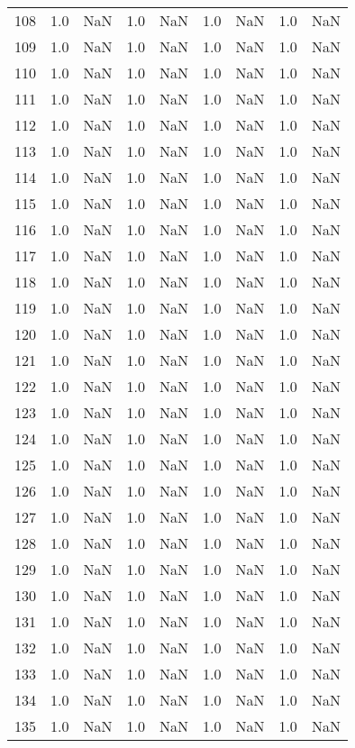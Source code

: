 \begin{tabular}{lrrrrrrrr}
108 & 1.0 & NaN & 1.0 & NaN & 1.0 & NaN & 1.0 & NaN \\
109 & 1.0 & NaN & 1.0 & NaN & 1.0 & NaN & 1.0 & NaN \\
110 & 1.0 & NaN & 1.0 & NaN & 1.0 & NaN & 1.0 & NaN \\
111 & 1.0 & NaN & 1.0 & NaN & 1.0 & NaN & 1.0 & NaN \\
112 & 1.0 & NaN & 1.0 & NaN & 1.0 & NaN & 1.0 & NaN \\
113 & 1.0 & NaN & 1.0 & NaN & 1.0 & NaN & 1.0 & NaN \\
114 & 1.0 & NaN & 1.0 & NaN & 1.0 & NaN & 1.0 & NaN \\
115 & 1.0 & NaN & 1.0 & NaN & 1.0 & NaN & 1.0 & NaN \\
116 & 1.0 & NaN & 1.0 & NaN & 1.0 & NaN & 1.0 & NaN \\
117 & 1.0 & NaN & 1.0 & NaN & 1.0 & NaN & 1.0 & NaN \\
118 & 1.0 & NaN & 1.0 & NaN & 1.0 & NaN & 1.0 & NaN \\
119 & 1.0 & NaN & 1.0 & NaN & 1.0 & NaN & 1.0 & NaN \\
120 & 1.0 & NaN & 1.0 & NaN & 1.0 & NaN & 1.0 & NaN \\
121 & 1.0 & NaN & 1.0 & NaN & 1.0 & NaN & 1.0 & NaN \\
122 & 1.0 & NaN & 1.0 & NaN & 1.0 & NaN & 1.0 & NaN \\
123 & 1.0 & NaN & 1.0 & NaN & 1.0 & NaN & 1.0 & NaN \\
124 & 1.0 & NaN & 1.0 & NaN & 1.0 & NaN & 1.0 & NaN \\
125 & 1.0 & NaN & 1.0 & NaN & 1.0 & NaN & 1.0 & NaN \\
126 & 1.0 & NaN & 1.0 & NaN & 1.0 & NaN & 1.0 & NaN \\
127 & 1.0 & NaN & 1.0 & NaN & 1.0 & NaN & 1.0 & NaN \\
128 & 1.0 & NaN & 1.0 & NaN & 1.0 & NaN & 1.0 & NaN \\
129 & 1.0 & NaN & 1.0 & NaN & 1.0 & NaN & 1.0 & NaN \\
130 & 1.0 & NaN & 1.0 & NaN & 1.0 & NaN & 1.0 & NaN \\
131 & 1.0 & NaN & 1.0 & NaN & 1.0 & NaN & 1.0 & NaN \\
132 & 1.0 & NaN & 1.0 & NaN & 1.0 & NaN & 1.0 & NaN \\
133 & 1.0 & NaN & 1.0 & NaN & 1.0 & NaN & 1.0 & NaN \\
134 & 1.0 & NaN & 1.0 & NaN & 1.0 & NaN & 1.0 & NaN \\
135 & 1.0 & NaN & 1.0 & NaN & 1.0 & NaN & 1.0 & NaN \\

\end{tabular}

